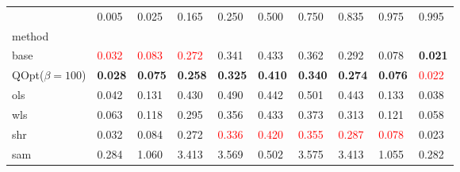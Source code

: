 \begin{tabular}{llllllllll}
\toprule
 & 0.005 & 0.025 & 0.165 & 0.250 & 0.500 & 0.750 & 0.835 & 0.975 & 0.995 \\
method &  &  &  &  &  &  &  &  &  \\
\midrule
base & \textcolor{red}{0.032} & \textcolor{red}{0.083} & \textcolor{red}{0.272} & 0.341 & 0.433 & 0.362 & 0.292 & 0.078 & \textbf{0.021} \\
\midrule
QOpt($\beta=100$) & \textbf{0.028} & \textbf{0.075} & \textbf{0.258} & \textbf{0.325} & \textbf{0.410} & \textbf{0.340} & \textbf{0.274} & \textbf{0.076} & \textcolor{red}{0.022} \\
ols & 0.042 & 0.131 & 0.430 & 0.490 & 0.442 & 0.501 & 0.443 & 0.133 & 0.038 \\
wls & 0.063 & 0.118 & 0.295 & 0.356 & 0.433 & 0.373 & 0.313 & 0.121 & 0.058 \\
shr & 0.032 & 0.084 & 0.272 & \textcolor{red}{0.336} & \textcolor{red}{0.420} & \textcolor{red}{0.355} & \textcolor{red}{0.287} & \textcolor{red}{0.078} & 0.023 \\
sam & 0.284 & 1.060 & 3.413 & 3.569 & 0.502 & 3.575 & 3.413 & 1.055 & 0.282 \\
\bottomrule
\end{tabular}
